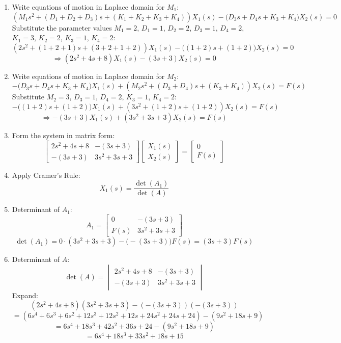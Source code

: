 \documentclass[11pt]{article}
\begin{document}
\begin{enumerate}[label=(\alph*), itemindent=*, leftmargin=*, nolistsep]

    \item Write equations of motion in Laplace domain for $M_1$:
    \[
    (M_1 s^2 + (D_1+D_2+D_3)s + (K_1+K_2+K_3+K_4))X_1(s)
    - \big(D_3 s + D_4 s + K_3 + K_4\big)X_2(s) = 0
    \]
    Substitute the parameter values $M_1=2$, $D_1=1$, $D_2=2$, $D_3=1$, $D_4=2$, $K_1=3$, $K_2=2$, $K_3=1$, $K_4=2$:
    \[
    (2s^2 + (1+2+1)s + (3+2+1+2))X_1(s) - \big((1+2)s + (1+2)\big)X_2(s) = 0
    \]
    \[
    \Rightarrow (2s^2 + 4s + 8)X_1(s) - (3s+3)X_2(s) = 0
    \]

    \item Write equations of motion in Laplace domain for $M_2$:
    \[
    -\big(D_3 s + D_4 s + K_3 + K_4\big)X_1(s)
    + (M_2 s^2 + (D_3+D_4)s + (K_3+K_4))X_2(s) = F(s)
    \]
    Substitute $M_2=3$, $D_3=1$, $D_4=2$, $K_3=1$, $K_4=2$:
    \[
    -\big((1+2)s + (1+2)\big)X_1(s) + (3s^2 + (1+2)s + (1+2))X_2(s) = F(s)
    \]
    \[
    \Rightarrow -(3s+3)X_1(s) + (3s^2+3s+3)X_2(s) = F(s)
    \]

    \item Form the system in matrix form:
    \[
    \begin{bmatrix}
    2s^2+4s+8 & -(3s+3) \\
    -(3s+3) & 3s^2+3s+3
    \end{bmatrix}
    \begin{bmatrix}
    X_1(s) \\
    X_2(s)
    \end{bmatrix}
    =
    \begin{bmatrix}
    0 \\
    F(s)
    \end{bmatrix}
    \]

    \item Apply Cramer’s Rule:
    \[
    X_1(s) = \frac{\det(A_1)}{\det(A)}
    \]

    \item Determinant of $A_1$:
    \[
    A_1 =
    \begin{bmatrix}
    0 & -(3s+3) \\
    F(s) & 3s^2+3s+3
    \end{bmatrix}
    \]
    \[
    \det(A_1) = 0 \cdot (3s^2+3s+3) - \big(-(3s+3)\big)F(s) = (3s+3)F(s)
    \]

    \item Determinant of $A$:
    \[
    \det(A) =
    \begin{vmatrix}
    2s^2+4s+8 & -(3s+3) \\
    -(3s+3) & 3s^2+3s+3
    \end{vmatrix}
    \]
    Expand:
    \[
    (2s^2+4s+8)(3s^2+3s+3) - (-(3s+3))(-(3s+3))
    \]
    \[
    = (6s^4 + 6s^3 + 6s^2 + 12s^3 + 12s^2 + 12s + 24s^2 + 24s + 24)
      - (9s^2+18s+9)
    \]
    \[
    = 6s^4 + 18s^3 + 42s^2 + 36s + 24 - (9s^2+18s+9)
    \]
    \[
    = 6s^4 + 18s^3 + 33s^2 + 18s + 15
    \]


\end{enumerate}
\end{document}

